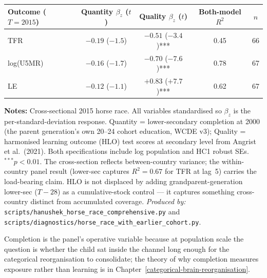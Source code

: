 \documentclass[12pt,letterpaper]{article}
\begin{document}
{\small\setlength{\tabcolsep}{6pt}
\begin{longtable}[]{@{}lcccc@{}}
\toprule
Outcome ($T{=}2015$) & Quantity $\beta_z$ ($t$) & Quality $\beta_z$ ($t$) & Both-model $R^2$ & $n$ \\
\midrule
\endhead
TFR        & $-0.19$ ($-1.5$)\hphantom{**}    & $-0.51$ ($-3.4$)*** & 0.45 & 66 \\
log(U5MR)  & $-0.16$ ($-1.7$)\hphantom{**}    & $-0.70$ ($-7.6$)*** & 0.78 & 67 \\
LE         & $-0.12$ ($-1.1$)\hphantom{**}    & $+0.83$ ($+7.7$)*** & 0.62 & 67 \\
\bottomrule
\end{longtable}}\addtocounter{table}{-1}%

\begin{minipage}{\dimexpr\textwidth-2em}
\scriptsize
\textbf{Notes:} Cross-sectional 2015 horse race. All variables
standardised so $\beta_z$ is the per-standard-deviation response.
Quantity = lower-secondary completion at 2000 (the parent generation's
own 20--24 cohort education, WCDE v3); Quality = harmonised learning
outcome (HLO) test scores at secondary level from Angrist et
al.\ (2021). Both specifications include log population and HC1
robust SEs. $^{***}p<0.01$. The cross-section reflects between-country
variance; the within-country panel result (lower-sec captures $R^2 =
0.67$ for TFR at lag~5) carries the load-bearing claim. HLO is not
displaced by adding grandparent-generation lower-sec ($T{-}28$) as a
cumulative-stock control --- it captures something cross-country
distinct from accumulated coverage.
\textit{Produced by:}
\texttt{scripts/hanushek\_horse\_race\_comprehensive.py} and
\texttt{scripts/diagnostics/horse\_race\_with\_earlier\_cohort.py}.
\end{minipage}

Completion is the panel's operative variable because at population
scale the question is whether the child sat inside the channel long
enough for the categorical reorganisation to consolidate; the theory
of why completion measures exposure rather than learning is in
Chapter~\ref{categorical-brain-reorganisation}.
\end{document}
